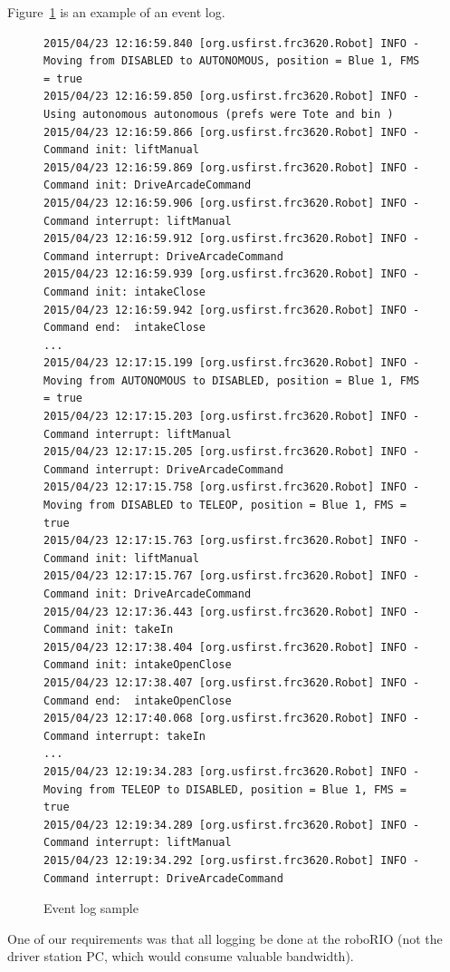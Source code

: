 \documentclass[]{article}
\begin{document}
\begin{itemize}[topsep=0pt]
Figure~\ref{fig:eventlog} is an example of an event log.
\begin{figure}[h]
\begin{mdframed}
\begin{lstlisting}[basicstyle=\ttfamily\tiny]
2015/04/23 12:16:59.840 [org.usfirst.frc3620.Robot] INFO - Moving from DISABLED to AUTONOMOUS, position = Blue 1, FMS = true
2015/04/23 12:16:59.850 [org.usfirst.frc3620.Robot] INFO - Using autonomous autonomous (prefs were Tote and bin )
2015/04/23 12:16:59.866 [org.usfirst.frc3620.Robot] INFO - Command init: liftManual
2015/04/23 12:16:59.869 [org.usfirst.frc3620.Robot] INFO - Command init: DriveArcadeCommand
2015/04/23 12:16:59.906 [org.usfirst.frc3620.Robot] INFO - Command interrupt: liftManual
2015/04/23 12:16:59.912 [org.usfirst.frc3620.Robot] INFO - Command interrupt: DriveArcadeCommand
2015/04/23 12:16:59.939 [org.usfirst.frc3620.Robot] INFO - Command init: intakeClose
2015/04/23 12:16:59.942 [org.usfirst.frc3620.Robot] INFO - Command end:  intakeClose
...
2015/04/23 12:17:15.199 [org.usfirst.frc3620.Robot] INFO - Moving from AUTONOMOUS to DISABLED, position = Blue 1, FMS = true
2015/04/23 12:17:15.203 [org.usfirst.frc3620.Robot] INFO - Command interrupt: liftManual
2015/04/23 12:17:15.205 [org.usfirst.frc3620.Robot] INFO - Command interrupt: DriveArcadeCommand
2015/04/23 12:17:15.758 [org.usfirst.frc3620.Robot] INFO - Moving from DISABLED to TELEOP, position = Blue 1, FMS = true
2015/04/23 12:17:15.763 [org.usfirst.frc3620.Robot] INFO - Command init: liftManual
2015/04/23 12:17:15.767 [org.usfirst.frc3620.Robot] INFO - Command init: DriveArcadeCommand
2015/04/23 12:17:36.443 [org.usfirst.frc3620.Robot] INFO - Command init: takeIn
2015/04/23 12:17:38.404 [org.usfirst.frc3620.Robot] INFO - Command init: intakeOpenClose
2015/04/23 12:17:38.407 [org.usfirst.frc3620.Robot] INFO - Command end:  intakeOpenClose
2015/04/23 12:17:40.068 [org.usfirst.frc3620.Robot] INFO - Command interrupt: takeIn
...
2015/04/23 12:19:34.283 [org.usfirst.frc3620.Robot] INFO - Moving from TELEOP to DISABLED, position = Blue 1, FMS = true
2015/04/23 12:19:34.289 [org.usfirst.frc3620.Robot] INFO - Command interrupt: liftManual
2015/04/23 12:19:34.292 [org.usfirst.frc3620.Robot] INFO - Command interrupt: DriveArcadeCommand
\end{lstlisting}
\caption{Event log sample}
\label{fig:eventlog}
\end{mdframed}
\end{figure}

One of our requirements was that all logging be done at the roboRIO (not the driver station PC, which would consume valuable bandwidth).


\end{itemize}
\end{document}
